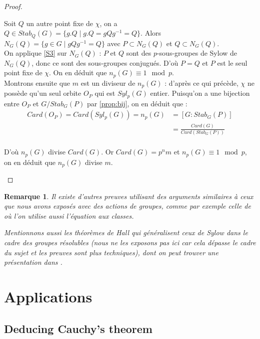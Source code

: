 \documentclass{article}
\theoremstyle{definition}
\theoremstyle{plain}
\theoremstyle{plain}
\theoremstyle{plain}
\theoremstyle{plain}
\newtheorem{remark}[subsubsection]{Remarque}
\theoremstyle{definition}
\theoremstyle{plain}
\theoremstyle{plain}
\begin{document}
\begin{proof}
\begin{enumerate}[label={\upshape(\roman*)}]
Soit \( Q \) un autre point fixe de \( \chi \), on a \(Q \in Stab_Q(G) = \{g.Q \mid g.Q = gQg^{-1} = Q \}  \). Alors \( N_G(Q) = \{ g \in G \mid gQg^{-1} = Q\} \) avec \( P \subset N_G(Q) \) et \( Q \subset N_G(Q) \). \\
On applique \ref{S3} sur \( N_G(Q) \) : \( P \) et \( Q \) sont des \(p\)-sous-groupes de Sylow de \( N_G(Q) \), donc ce sont des sous-groupes conjugués. D'où \( P = Q \) et \( P \) est le seul point fixe de \( \chi \). On en déduit que \( n_p(G) \equiv 1 \mod p \). \\
Montrons ensuite que \( m \) est un diviseur de \( n_p(G) \) : d'après ce qui précède, \( \chi \) ne possède qu'un seul orbite \( O_P \) qui est \( Syl_p({G}) \) entier. Puisqu'on a une bijection entre \( O_P \) et \( G/Stab_G(P) \) par \ref{prop:bij}, on en déduit que :
\begin{align*}
	Card(O_P)= Card(Syl_p(G)) = n_p(G) &= [G : Stab_G(P) ] \\ 
		 &= \frac{Card(G)}{Card(Stab_G(P))}\\
\end{align*}

D'où \( n_p(G) \) divise \( Card(G) \). Or \( Card(G) = p^{n}m \) et \( n_p(G) \equiv 1\mod p \), on en déduit que \( n_p(G) \) divise \( m \).
	\end{enumerate}
\end{proof}

\begin{remark}
	Il existe d'autres preuves utilisant des arguments similaires à ceux que nous avons exposés avec des actions de groupes, comme par exemple celle de \cite[p.~ 140-141]{dummit2003abstract} où l'on utilise aussi l'équation aux classes.

	Mentionnons aussi les théorèmes de Hall qui généralisent ceux de Sylow dans le cadre des groupes résolubles (nous ne les exposons pas ici car cela dépasse le cadre du sujet et les preuves sont plus techniques), dont on peut trouver une présentation dans \cite[p.~ 40-44]{serre1979ens}.
\end{remark}

\section{Applications}

\subsection{Deducing Cauchy's theorem}
\end{document}
